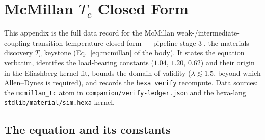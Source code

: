 \section{McMillan $T_c$ Closed Form}
\label{app:mcmillan}

This appendix is the full data record for the McMillan
\citep{mcmillan1968} weak-/intermediate-coupling transition-temperature
closed form --- pipeline stage \textcircled{\scriptsize 3}, the
materials-discovery $T_c$ keystone (Eq.~\eqref{eq:mcmillan} of the body).
It states the equation verbatim, identifies the load-bearing constants
($1.04$, $1.20$, $0.62$) and their origin in the Eliashberg-kernel fit,
bounds the domain of validity ($\lambda\!\lesssim\!1.5$, beyond which
Allen--Dynes is required), and records the \texttt{hexa verify} recompute.
Data sources: the \texttt{mcmillan\_tc} atom in
\texttt{companion/verify-ledger.json} and the hexa-lang
\texttt{stdlib/material/sim.hexa} kernel.

\subsection{The equation and its constants}
\label{app:mcmillan-eq}

